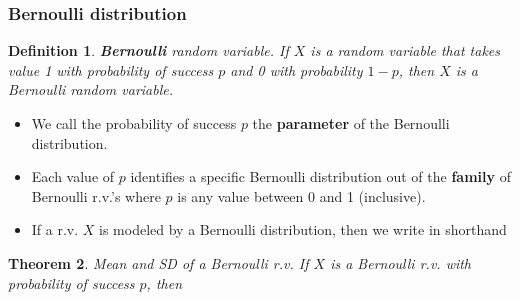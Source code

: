 \documentclass[12pt]{amsart}
\newtheorem{theorem}{Theorem}[section]
\newtheorem{definition}[theorem]{Definition}
\begin{document}
{\vspace{.5cm}
\subsubsection{Bernoulli distribution}


\vspace{.5cm}

\begin{definition}{\textbf{Bernoulli} random variable.} \newline
If $X$ is a random variable that takes value 1 with probability of success $p$ and 0 with probability $1-p$, then $X$ is a Bernoulli random variable. 
\end{definition}
\vspace{1cm}

\begin{itemize}
\item We call the probability of success $p$ the \textbf{parameter} of the Bernoulli distribution. 
\item Each value of $p$ identifies a specific Bernoulli distribution out of the \textbf{family} of Bernoulli r.v.'s where $p$ is any value between 0 and 1 (inclusive). 
\item If a r.v. $X$ is modeled by a Bernoulli distribution, then we write in shorthand


\vspace{1.5cm}
\end{itemize}




\begin{theorem}{Mean and SD of a Bernoulli r.v.} \newline
If $X$ is a Bernoulli r.v. with probability of success $p$, then 



\end{theorem}



}
\end{document}

